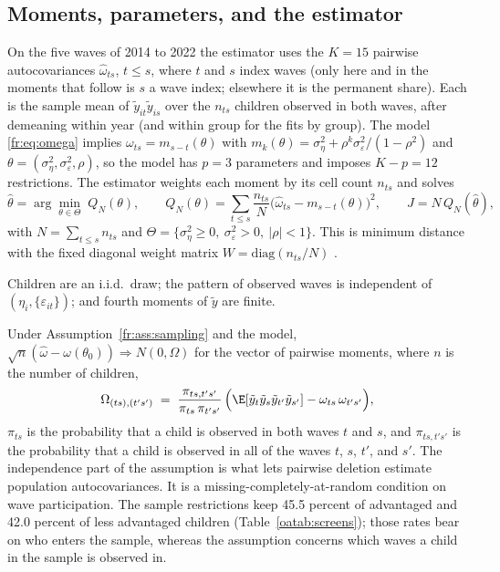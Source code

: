 \subsection{Moments, parameters, and the estimator}

On the five waves of 2014 to 2022 the estimator uses the $K = 15$ pairwise
autocovariances $\hat\omega_{ts}$, $t \le s$, where $t$ and $s$ index
waves (only here and in the moments that follow is $s$ a wave index; elsewhere it is the permanent share). Each is the sample mean of $\tilde y_{it}\tilde y_{is}$ over the
$n_{ts}$ children observed in both waves, after demeaning within year
(and within group for the fits by group). The model \eqref{fr:eq:omega}
implies $\omega_{ts} = m_{s-t}(\theta)$ with
$m_k(\theta) = \sigma^2_\eta + \rho^k\sigma^2_\varepsilon/(1-\rho^2)$
and $\theta = (\sigma^2_\eta, \sigma^2_\varepsilon, \rho)$, so the model
has $p = 3$ parameters and imposes $K - p = 12$ restrictions. The
estimator weights each moment by its cell count $n_{ts}$ and solves
\begin{equation}
\hat\theta = \arg\min_{\theta \in \Theta}\; Q_N(\theta), \qquad
Q_N(\theta) = \sum_{t \le s} \frac{n_{ts}}{N}\big(\hat\omega_{ts} - m_{s-t}(\theta)\big)^2,
\qquad J = N\,Q_N(\hat\theta),
\label{fr:eq:md}
\end{equation}
with $N = \sum_{t\le s} n_{ts}$ and
$\Theta = \{\sigma^2_\eta \ge 0,\ \sigma^2_\varepsilon > 0,\ |\rho| < 1\}$.
This is minimum distance with the fixed diagonal weight matrix
$W = \mathrm{diag}(n_{ts}/N)$ \citep{Chamberlain1984, NeweyMcFadden1994}.

\begin{assumption}[Sampling]
\label{fr:ass:sampling}
Children are an i.i.d.\ draw; the pattern of observed waves is independent of $(\eta_i, \{\varepsilon_{it}\})$; and fourth moments of $\tilde y$ are
finite.
\end{assumption}

Under Assumption~\ref{fr:ass:sampling} and the model,
$\sqrt{n}(\hat\omega - \omega(\theta_0)) \Rightarrow N(0, \Omega)$
for the vector of pairwise moments, where $n$ is the number of children,
\[
\Omega_{(ts),(t's')} \;=\; \frac{\pi_{ts,t's'}}{\pi_{ts}\,\pi_{t's'}}\,
\Big(\E[\tilde y_t\tilde y_s\tilde y_{t'}\tilde y_{s'}] - \omega_{ts}\,\omega_{t's'}\Big),
\]
$\pi_{ts}$ is the probability that a child is observed in both waves $t$
and $s$, and $\pi_{ts,t's'}$ is the probability that a child is observed
in all of the waves $t$, $s$, $t'$, and $s'$. The independence part of the
assumption is what lets pairwise deletion estimate population
autocovariances. It is a missing-completely-at-random condition on wave participation. The sample restrictions keep 45.5 percent of advantaged and 42.0 percent of less advantaged children (Table~\ref{oatab:screens}); those rates bear on who enters the sample, whereas the assumption concerns which waves a child in the sample is observed in.

